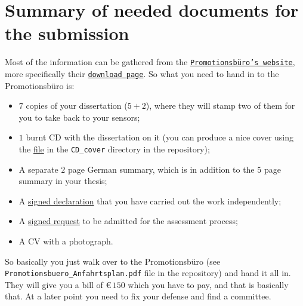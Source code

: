 \documentclass[a4paper]{article}
\begin{document}
    
    \section*{Summary of needed documents for the submission}
        Most of the information can be gathered from the \href{https://www.uni-frankfurt.de/42800906/startseite}{\texttt{Promotionsb\"uro's website}}, more specifically their \href{https://www.uni-frankfurt.de/42800991/downloads}{\texttt{download page}}.
        So what you need to hand in to the Promotionsb\"uro is:
        \begin{itemize}
            \item $7$ copies of your dissertation ($5 + 2$), where they will stamp two of them for you to take back to your sensors;
            \item $1$ burnt CD with the dissertation on it (you can produce a nice cover using the \href{run:Cover.tex}{file} in the \texttt{CD\_cover} directory in the repository);
            \item A separate $2$ page German summary, which is in addition to the $5$ page summary in your thesis;
            \item A \href{run:Erlaerung_Formular.pdf}{signed declaration} that you have carried out the work independently;
            \item A \href{run:Antrag_Formular.pdf}{signed request} to be admitted for the assessment process;
            \item A CV with a photograph.
        \end{itemize}
        So basically you just walk over to the Promotionsb\"uro (see \texttt{Promotionsbuero\_Anfahrtsplan.pdf} file in the repository) and hand it all in.
        They will give you a bill of \euro$\,150$ which you have to pay, and that is basically that.
        At a later point you need to fix your defense and find a committee.
    
\end{document}
